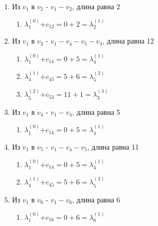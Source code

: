 \documentclass{article}
\newcommand\ld[2]{$\lambda^{(#1)}_{#2}$}
\begin{document}
\\
\begin{enumerate}
    \item Из $v_1$ в $v_2$ - $v_1 - v_2$, длина равна 2
    \begin{enumerate}
        \item \ld{0}{1}$+ c_{12} = 0 + 2 =$\ld{1}{2}
    \end{enumerate}
    
    \item Из $v_1$ в $v_3$ - $v_1 - v_4 - v_5 - v_3$, длина равна 12
    \begin{enumerate}
        \item \ld{0}{1}$+ c_{14} = 0 + 5 =$\ld{1}{4}
        \item \ld{1}{4}$+ c_{45} = 5 + 6 =$\ld{2}{5}
        \item \ld{2}{5}$+ c_{53} = 11 + 1 =$\ld{3}{3}
    \end{enumerate}
    
    \item Из $v_1$ в $v_4$ - $v_1 - v_4$, длина равна 5
    \begin{enumerate}
        \item \ld{0}{1}$+ c_{14} = 0 + 5 =$\ld{1}{4}
    \end{enumerate}

    \item Из $v_1$ в $v_5$ - $v_1 - v_4 - v_5$, длина равна 11
    \begin{enumerate}
        \item \ld{0}{1}$+ c_{14} = 0 + 5 =$\ld{1}{4}
        \item \ld{1}{4}$+ c_{45} = 5 + 6 =$\ld{2}{5}
    \end{enumerate}

    \item Из $v_1$ в $v_6$ - $v_1 - v_6$, длина равна 6
    \begin{enumerate}
        \item \ld{0}{1}$+ c_{16} = 0 + 6 =$\ld{1}{6}
    \end{enumerate}


\end{enumerate}
\end{document}
